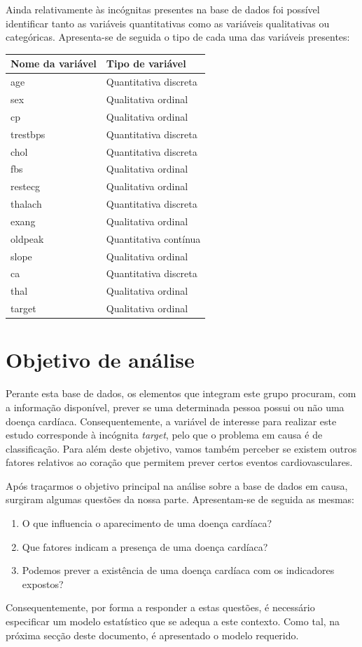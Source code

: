 \documentclass[a4paper]{report}
\begin{document}
{	Ainda relativamente às incógnitas presentes na base de dados foi possível identificar tanto as variáveis quantitativas como as variáveis qualitativas ou categóricas. 
	Apresenta-se de seguida o tipo de cada uma das variáveis presentes:
	\begin{center}
		\begin{tabular}{ | l | l | }
		\hline
		\textbf{Nome da variável} & \textbf{Tipo de variável} \\ \hline
		age & Quantitativa discreta \\ \hline
		sex & Qualitativa ordinal \\ \hline
		cp & Qualitativa ordinal \\ \hline
		trestbps & Quantitativa discreta \\ \hline
		chol & Quantitativa discreta \\ \hline
		fbs & Qualitativa ordinal \\ \hline
		restecg & Qualitativa ordinal \\ \hline
		thalach & Quantitativa discreta \\ \hline
		exang & Qualitativa ordinal \\ \hline
		oldpeak & Quantitativa contínua \\ \hline
		slope & Qualitativa ordinal \\ \hline
		ca & Quantitativa discreta \\ \hline
		thal & Qualitativa ordinal \\ \hline
		target & Qualitativa ordinal \\ \hline
		\end{tabular}
	\end{center}
	
	\section{Objetivo de análise}
	Perante esta base de dados, os elementos que integram este grupo procuram, com a informação disponível, prever se uma determinada pessoa possui ou não uma doença cardíaca. Consequentemente,
	a variável de interesse para realizar este estudo corresponde à incógnita \textit{target}, pelo que o problema em causa é de classificação.
	Para além deste objetivo, vamos também perceber se existem outros fatores relativos ao coração que permitem prever certos eventos cardiovasculares. 
	
	Após traçarmos o objetivo principal na análise sobre a base de dados em causa, surgiram algumas questões da nossa parte. Apresentam-se de seguida as mesmas:
	\begin{enumerate}
	    \item O que influencia o aparecimento de uma doença cardíaca?
	    \item Que fatores indicam a presença de uma doença cardíaca?
		\item Podemos prever a existência de uma doença cardíaca com os indicadores expostos?
	\end{enumerate}
	
	Consequentemente, por forma a responder a estas questões, é necessário especificar um modelo estatístico que se adequa a este contexto. Como tal, na próxima secção deste documento, 
	é apresentado o modelo requerido.
}
\end{document}
